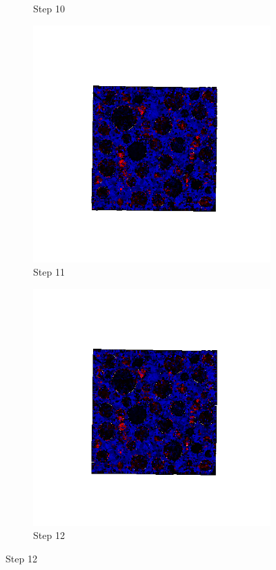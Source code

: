 \begin{figure}[ht!]
\begin{subfigure}{.25\textwidth}
      \caption{Step 10}
      \end{subfigure}%
      \begin{subfigure}{.25\textwidth}
        \centering
        \includegraphics[width=1.0\linewidth]{Files/A30P75_3_IS/DEP50-STEP(011).png}
      \caption{Step 11}
      \end{subfigure}%
      \begin{subfigure}{.25\textwidth}
        \centering
        \includegraphics[width=1.0\linewidth]{Files/A30P75_3_IS/DEP50-STEP(012).png}
      \caption{Step 12}
      \end{subfigure}


\end{figure}
